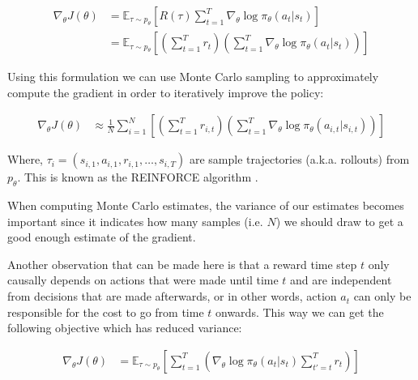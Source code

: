 \begin{align}
    \nabla_\theta J(\theta) &= \mathbb{E}_{\tau \sim p_\theta} \left[ R(\tau) \sum_{t=1}^T \nabla_\theta \log \pi_\theta(a_t|s_t) \right]\\
    &= \mathbb{E}_{\tau \sim p_\theta} \left[ \left( \sum_{t=1}^T r_t \right) \left( \sum_{t=1}^T \nabla_\theta \log \pi_\theta(a_t|s_t) \right) \right]
\end{align}

Using this formulation we can use Monte Carlo sampling  to approximately compute the gradient in order to iteratively improve the policy:


\begin{align}
    \nabla_\theta J(\theta) &\approx \frac{1}{N} \sum_{i=1}^{N} \left[ \left( \sum_{t=1}^T r_{i,t} \right) \left( \sum_{t=1}^T \nabla_\theta \log \pi_\theta(a_{i,t}|s_{i,t}) \right) \right]
\end{align}

Where, $\tau_i = (s_{i,1}, a_{i,1}, r_{i,1}, \dots, s_{i,T})$ are sample trajectories (a.k.a. rollouts) from $p_\theta$. This is known as the REINFORCE algorithm . 

When computing Monte Carlo estimates, the variance of our estimates becomes important since it indicates how many samples (i.e. $N$) we should draw to get a good enough estimate of the gradient.

Another observation that can be made here is that a reward time step $t$ only causally depends on actions that were made until time $t$ and are independent from decisions that are made afterwards, or in other words, action $a_t$ can only be responsible for the cost to go from time $t$ onwards. This way we can get the following objective which has reduced variance:

\begin{align}
    \nabla_\theta J(\theta) &= \mathbb{E}_{\tau \sim p_\theta} \left[ \sum_{t=1}^T \left( \nabla_\theta \log \pi_\theta(a_t|s_t)  \sum_{t'=t}^T r_t \right) \right]
\end{align}
